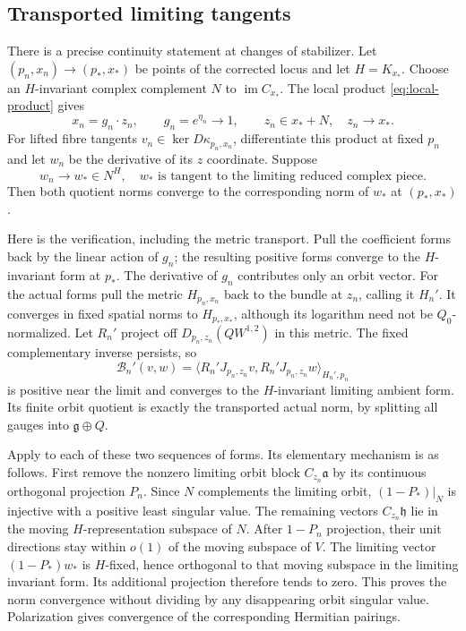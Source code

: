 \documentclass[11pt]{amsart}
\theoremstyle{definition}
\theoremstyle{remark}
\newcommand{\im}{\operatorname{im}}
\begin{document}
\subsection{Transported limiting tangents}
There is a precise continuity statement at changes of stabilizer.
Let $(p_n,x_n)\to(p_*,x_*)$ be points of the corrected locus and
let $H=K_{x_*}$. Choose an $H$-invariant complex complement $N$
to $\im C_{x_*}$. The local product \eqref{eq:local-product} gives
\[
 x_n=g_n\cdot z_n,\qquad g_n=e^{\eta_n}\longrightarrow1,
 \qquad z_n\in x_*+N,\quad z_n\longrightarrow x_*.
\]
For lifted fibre tangents $v_n\in\ker D\kappa_{p_n,x_n}$,
differentiate this product at fixed $p_n$ and let $w_n$ be the
derivative of its $z$ coordinate. Suppose
\begin{equation}\label{eq:tangent-limit-condition}
 w_n\longrightarrow w_*\in N^H,
 \quad w_*\text{ is tangent to the limiting reduced complex piece}.
\end{equation}
Then both quotient norms converge to the corresponding norm of $w_*$
at $(p_*,x_*)$.

Here is the verification, including the metric transport. Pull the
coefficient forms back by the linear action of $g_n$; the resulting
positive forms converge to the $H$-invariant form at $p_*$. The
derivative of $g_n$ contributes only an orbit vector. For the actual
forms pull the metric $H_{p_n,x_n}$ back to the bundle at $z_n$,
calling it $H_n'$. It converges in fixed spatial norms to $H_{p_*,x_*}$,
although its logarithm need not be $Q_0$-normalized. Let $R_n'$ project
off $D_{p_n,z_n}(QW^{1,2})$ in this metric. The fixed complementary
inverse persists, so
\[
 \mathcal B_n'(v,w)=
 \langle R_n'J_{p_n,z_n}v,R_n'J_{p_n,z_n}w\rangle_{H_n',p_n}
\]
is positive near the limit and converges to the $H$-invariant limiting
ambient form. Its finite orbit quotient is exactly the transported
actual norm, by splitting all gauges into $\mathfrak g\oplus Q$.

Apply \cite[Lemma 8.2]{WuebbenWallMetrics26} to each of these two
sequences of forms. Its elementary mechanism is as follows. First remove
the nonzero limiting orbit block $C_{z_n}\mathfrak a$ by its continuous
orthogonal projection $P_n$. Since $N$ complements the limiting orbit,
$(1-P_*)|_N$ is injective with a positive least singular value.
The remaining vectors $C_{z_n}\mathfrak h$ lie in the moving
$H$-representation subspace of $N$. After $1-P_n$ projection, their
unit directions stay within $o(1)$ of the moving subspace of $V$.
The limiting vector $(1-P_*)w_*$ is $H$-fixed, hence orthogonal to
that moving subspace in the limiting invariant form. Its additional
projection therefore tends to zero. This proves the norm convergence
without dividing by any disappearing orbit singular value. Polarization
gives convergence of the corresponding Hermitian pairings.
\end{document}

